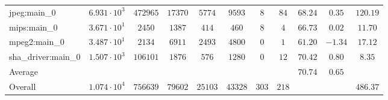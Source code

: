 \begin{tabular}{|l|c|c|c|c|c|c|c|c|c|c|}
jpeg:main\_0            & $ 6.931 \cdot 10^{3} $ & $ 472965 $ & $ 17370 $ & $ 5774  $ & $ 9593  $ & $ 8   $ & $ 84  $ & $ 68.24       $ & $ 0.35    $ & $ 120.19  $ \\
mips:main\_0            & $ 3.671 \cdot 10^{1} $ & $ 2450   $ & $ 1387  $ & $ 414   $ & $ 460   $ & $ 8   $ & $ 4   $ & $ 66.73       $ & $ 0.02    $ & $ 11.70   $ \\
mpeg2:main\_0           & $ 3.487 \cdot 10^{1} $ & $ 2134   $ & $ 6911  $ & $ 2493  $ & $ 4800  $ & $ 0   $ & $ 1   $ & $ 61.20       $ & $ -1.34   $ & $ 17.12   $ \\
sha\_driver:main\_0     & $ 1.507 \cdot 10^{3} $ & $ 106101 $ & $ 1876  $ & $ 576   $ & $ 1280  $ & $ 0   $ & $ 12  $ & $ 70.42       $ & $ 0.80    $ & $ 8.35    $ \\
\hline
Average                 & $                    $ & $        $ & $       $ & $       $ & $       $ & $     $ & $     $ & $ 70.74       $ & $ 0.65    $ & $         $ \\
\hline
Overall                 & $ 1.074 \cdot 10^{4} $ & $ 756639 $ & $ 79602 $ & $ 25103 $ & $ 43328 $ & $ 303 $ & $ 218 $ & $             $ & $         $ & $ 486.37  $ \\
\hline
\end{tabular}
